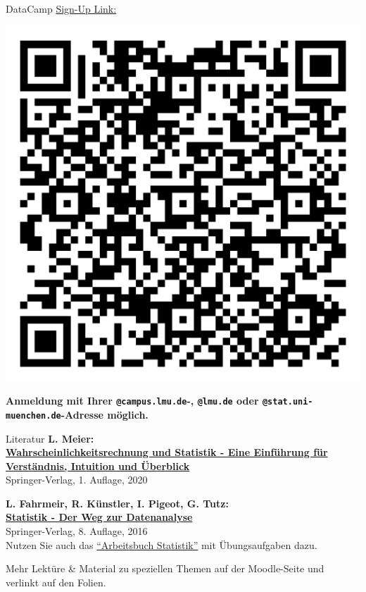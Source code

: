 \documentclass[
  10pt,
  ignorenonframetext,
]{beamer}
\begin{document}
\begin{frame}[fragile]{DataCamp}
\label{datacamp-1}
\href{https://www.datacamp.com/groups/shared_links/f2306b5305f638f41f0d7e700cee5212a0009421a281db02329e09851bb905e1}{Sign-Up
Link:}

\centering \includegraphics[height = 0.75\textheight]{pics/qr-datacamp-2425.png}

\footnotesize

\textbf{Anmeldung mit Ihrer \texttt{@campus.lmu.de}-, \texttt{@lmu.de}
oder \texttt{@stat.uni-muenchen.de}-Adresse möglich.}
\end{frame}

\begin{frame}{Literatur}
\label{literatur}
\textbf{L. Meier:}\\
\href{https://link-springer-com.emedien.ub.uni-muenchen.de/book/10.1007\%2F978-3-662-61488-4}{\textbf{Wahrscheinlichkeitsrechnung
und Statistik - Eine Einführung für Verständnis, Intuition und
Überblick}}\\
Springer-Verlag, 1. Auflage, 2020

\textbf{L. Fahrmeir, R. Künstler, I. Pigeot, G. Tutz:}\\
\href{https://link-springer-com.emedien.ub.uni-muenchen.de/book/10.1007\%2F978-3-662-50372-0}{\textbf{Statistik
- Der Weg zur Datenanalyse}}\\
Springer-Verlag, 8. Auflage, 2016\\
Nutzen Sie auch das
\href{https://link-springer-com.emedien.ub.uni-muenchen.de/book/10.1007/b138336}{``Arbeitsbuch
Statistik''} mit Übungsaufgaben dazu.

Mehr Lektüre \& Material zu speziellen Themen auf der Moodle-Seite und
verlinkt auf den Folien.
\end{frame}
\end{document}
